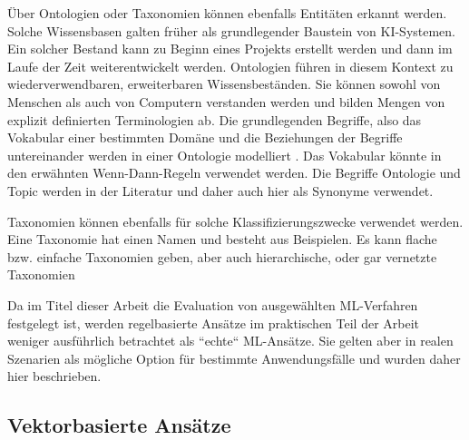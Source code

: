 Über Ontologien oder Taxonomien können ebenfalls Entitäten erkannt werden. Solche Wissensbasen galten früher als grundlegender Baustein von KI-Systemen. Ein solcher Bestand kann zu Beginn eines Projekts erstellt werden und dann im Laufe der Zeit weiterentwickelt werden. Ontologien führen in diesem Kontext zu wiederverwendbaren, erweiterbaren Wissensbeständen. Sie können sowohl von Menschen als auch von Computern verstanden werden und bilden Mengen von explizit definierten Terminologien ab. Die grundlegenden Begriffe, also das Vokabular einer bestimmten Domäne und die Beziehungen der Begriffe untereinander werden in einer Ontologie modelliert \cite[S. 37-55]{ontologies}. Das Vokabular könnte in den erwähnten Wenn-Dann-Regeln verwendet werden. Die Begriffe Ontologie und Topic werden in der Literatur und daher auch hier als Synonyme verwendet. 

Taxonomien können ebenfalls für solche Klassifizierungszwecke verwendet werden. Eine Taxonomie hat einen Namen und besteht aus Beispielen. Es kann flache bzw. einfache Taxonomien geben, aber auch hierarchische, oder gar vernetzte Taxonomien \cite{inmon}

Da im Titel dieser Arbeit die Evaluation von ausgewählten ML-Verfahren festgelegt ist, werden regelbasierte Ansätze im praktischen Teil der Arbeit weniger ausführlich betrachtet als ``echte`` ML-Ansätze. Sie gelten aber in realen Szenarien als mögliche Option für bestimmte Anwendungsfälle und wurden daher hier beschrieben.

\subsection{Vektorbasierte Ansätze}

